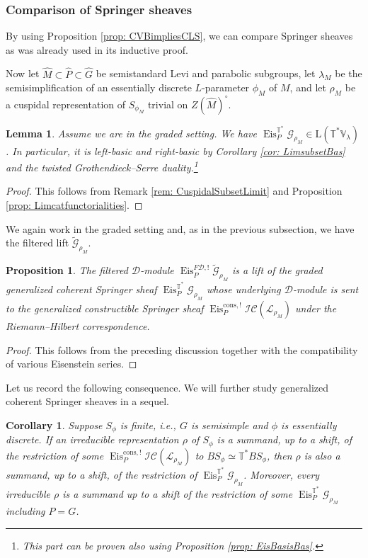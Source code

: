 \documentclass{amsart}
\newtheorem{lemma}[theorem]{Lemma}
\newtheorem{proposition}[theorem]{Proposition}
\newtheorem{corollary}[theorem]{Corollary}
\theoremstyle{definition}
\theoremstyle{remark}
\numberwithin{equation}{section}
\newcommand{\mc}{\mathcal}
\newcommand{\wh}{\widehat}
\DeclareMathOperator{\Eis}{\mathrm{Eis}}
\newcommand{\V}{\mathbb{V}}
\newcommand{\T}{\mathbb{T}}
\newcommand{\mrL}{\mathrm{L}}
\begin{document}
\subsubsection{Comparison of Springer sheaves}
By using Proposition \ref{prop: CVBimpliesCLS}, we can compare Springer sheaves as was already used in its inductive proof. 

Now let $\wh M\subset \wh P\subset  \wh G$ be semistandard Levi and parabolic subgroups, let $\lambda_M$ be the semisimplification of an essentially discrete $L$-parameter $\phi_M$ of $M$, and let $\rho_M$ be a cuspidal representation of $S_{\phi_M}$ trivial on $Z(\wh M)^{\circ}$. 

\begin{lemma}\label{lem: EisIsLimit}
Assume we are in the graded setting. We have $\Eis^{\T^{\ast}}_P \mc{G}_{\rho_M} \in \mrL(\T^*\V_\lambda)$. In particular, it is left-basic and right-basic by Corollary \ref{cor: LimsubsetBas} and the twisted Grothendieck--Serre duality.\footnote{This part can be proven also using Proposition \ref{prop: EisBasisBas}.}
\end{lemma}

\begin{proof}
This follows from Remark \ref{rem: CuspidalSubsetLimit} and Proposition \ref{prop: Limcatfunctorialities}. 
\end{proof}

We again work in the graded setting and, as in the previous subsection, we have the filtered lift $\widetilde{\mc G}_{\rho_M}$. 

\begin{proposition}{\label{prop: filtered springer}}
The filtered $\mc D$-module $\Eis_{P}^{F\mc D, !} \widetilde{\mc G}_{\rho_M}$ is a lift of the graded generalized coherent Springer sheaf $\Eis_{P}^{\T^*} \mc G_{\rho_M}$ whose underlying $\mc D$-module is sent to the generalized constructible Springer sheaf $\Eis_{P}^{\mathrm{cons}, !} \mc{IC}(\mc L_{\rho_M})$ under the Riemann--Hilbert correspondence.     
\end{proposition}

\begin{proof}
This follows from the preceding discussion together with the compatibility of various Eisenstein series. 
\end{proof}

Let us record the following consequence. We will further study generalized coherent Springer sheaves in a sequel. 

\begin{corollary}{\label{cor: coherentspringersummand}}
Suppose $S_\phi$ is finite, i.e., $G$ is semisimple and $\phi$ is essentially discrete. 
If an irreducible representation $\rho$ of $S_{\phi}$ is a summand, up to a shift, of the restriction of some $\Eis_{P}^{\mathrm{cons}, !} \mc{IC}(\mc L_{\rho_M})$ to $BS_{\phi} \simeq \T^{\ast} BS_{\phi}$, then $\rho$ is also a summand, up to a shift, of the restriction of $\Eis_{P}^{\T^*} \mc G_{\rho_M}$. Moreover, every irreducible $\rho$ is a summand up to a shift of the restriction of some $\Eis_{P}^{\T^*} \mc G_{\rho_M}$ including $P=G$. 
\end{corollary}
\end{document}
